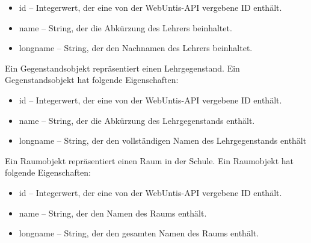 \begin{itemize}
    \item id -- Integerwert, der eine von der WebUntis-API vergebene ID enthält.
    \item name -- String, der die Abkürzung des Lehrers beinhaltet.
    \item longname -- String, der den Nachnamen des Lehrers beinhaltet. 
\end{itemize}


Ein Gegenstandsobjekt repräsentiert einen Lehrgegenstand. Ein Gegenstandsobjekt hat folgende Eigenschaften: 

\begin{itemize}
    \item id -- Integerwert, der eine von der WebUntis-API vergebene ID enthält. 
    \item name -- String, der die Abkürzung des Lehrgegenstands enthält.
    \item longname -- String, der den vollständigen Namen des Lehrgegenstands enthält
\end{itemize}


Ein Raumobjekt repräsentiert einen Raum in der Schule. Ein Raumobjekt hat folgende Eigenschaften: 

\begin{itemize}
    \item id -- Integerwert, der eine von der WebUntis-API vergebene ID enthält.
    \item name -- String, der den Namen des Raums enthält.
    \item longname -- String, der den gesamten Namen des Raums enthält. 
\end{itemize}